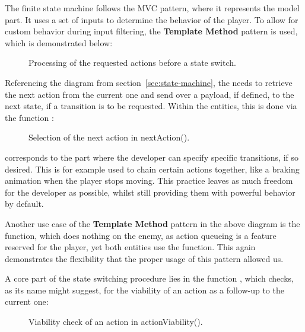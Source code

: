 \documentclass[../Main.tex]{subfiles}
\begin{document}
The finite state machine follows the MVC pattern, where it represents the model part. It uses a set of inputs to determine the behavior of the player. To allow for custom behavior during input filtering, the \textbf{Template Method} pattern is used, which is demonstrated below:

\begin{figure}[H]
    \centering
    
    \caption[Processing of the requested actions before a state switch. Own figure.]{Processing of the requested actions before a state switch.}
    \label{fig:process-actions}
\end{figure}

Referencing the diagram from section~\ref{sec:state-machine}, the  needs to retrieve the next action from the current one and send over a payload, if defined, to the next state, if a transition is to be requested. Within the entities, this is done via the function :

\begin{figure}[H]
    \centering
    
    \caption[Selection of the next action in nextAction(). Own figure.]{Selection of the next action in nextAction().}
    \label{fig:next-action}
\end{figure}

 corresponds to the part where the developer can specify specific transitions, if so desired. This is for example used to chain certain actions together, like a braking animation when the player stops moving. This practice leaves as much freedom for the developer as possible, whilst still providing them with powerful behavior by default.

Another use case of the \textbf{Template Method} pattern in the above diagram is the  function, which does nothing on the enemy, as action queueing is a feature reserved for the player, yet both entities use the  function. This again demonstrates the flexibility that the proper usage of this pattern allowed us.

A core part of the state switching procedure lies in the function , which checks, as its name might suggest, for the viability of an action as a follow-up to the current one:

\begin{figure}[H]
    \centering
    
    \caption[Viability check of an action in actionViability(). Own figure.]{Viability check of an action in actionViability().}
    \label{fig:action-viability}
\end{figure}
\end{document}
